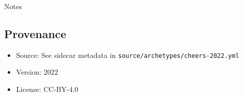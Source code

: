 \documentclass[11pt]{article}
\def\tightlist{}
\begin{document}
\begin{Form}
{Notes}

\subsection{Provenance}\label{provenance}

\begin{itemize}
\tightlist
\item
  Source: See sidecar metadata in
  \texttt{source/archetypes/cheers-2022.yml}
\item
  Version: 2022
\item
  License: CC-BY-4.0
\end{itemize}

\end{Form}
\end{document}
